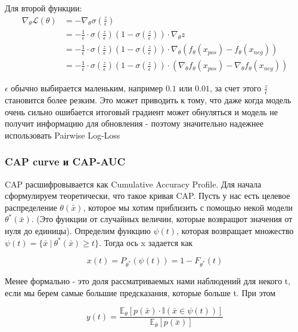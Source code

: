 \documentclass{article}
\begin{document}
    Для второй функции:
    $$
    \begin{aligned}
    \nabla_\theta \mathcal{L}(\theta) &= -\nabla_\theta \sigma(\frac{z}{\epsilon}) \\
    &= - \frac{1}{\epsilon} \cdot \sigma(\frac{z}{\epsilon})(1 - \sigma(\frac{z}{\epsilon})) \cdot \nabla_\theta z \\
    &= - \frac{1}{\epsilon} \cdot \sigma(\frac{z}{\epsilon})(1 - \sigma(\frac{z}{\epsilon})) \cdot \nabla_\theta (f_\theta(x_{pos}) - f_\theta(x_{neg})) \\
    &= - \frac{1}{\epsilon} \cdot \sigma(\frac{z}{\epsilon})(1 - \sigma(\frac{z}{\epsilon})) \cdot (\nabla_\theta f_\theta(x_{pos}) - \nabla_\theta f_\theta(x_{neg}))
    \end{aligned}
    $$

    $\epsilon$ обычно выбирается маленьким, например $0.1$ или $0.01$, за счет этого $\frac{z}{\epsilon}$ становится более резким. 
    Это может приводить к тому, что даже когда модель очень сильно ошибается итоговый градиент может обнуляться и модель не получит информацию 
    для обновления - поэтому значительно надежнее использовать Pairwise Log-Loss


    \subsubsection{CAP curve и CAP-AUC}

    CAP расшифровывается как Cumulative Accuracy Profile. Для начала сформулируем теоретически, что такое кривая CAP. 
    Пусть у нас есть целевое распределение $\theta(\bar{x})$, которое мы хотим приблизить с помощью некой модели $\theta^{*}(\bar{x})$. (Это функции от случайных величин, которые возвращют значения от 
    нуля до единицы). Определим функцию $\psi(t)$, которая возвращает множество 
    $\psi(t) = \{\bar{x} \ | \ \theta^{*}(\bar{x}) \geq t   \}$. Тогда ось x задается как 

    \begin{equation}
        x(t) = P_{\theta^{*}}(\psi(t)) = 1 - F_{\theta^{*}}(t)
    \end{equation}

    Менее формально - это доля рассматриваемых нами наблюдений для некого t, если мы берем самые большие предсказания, которые больше t.
    При этом 

    \begin{equation}
        y(t) = \frac{\mathbb{E}_{\theta}[p(\bar{x}) \cdot \mathbb{I}(\bar{x} \in \psi(t)) ]}{\mathbb{E}_{\theta}[p(\bar{x})]}
    \end{equation}
\end{document}
